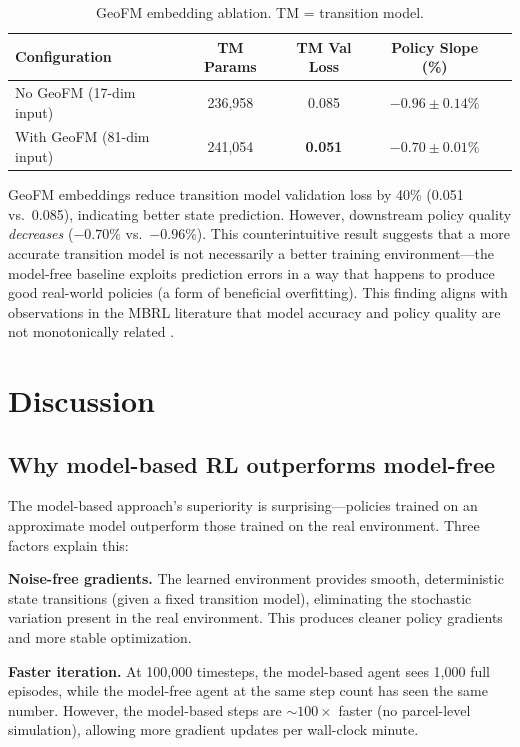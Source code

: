 \documentclass[11pt]{article}
\begin{document}
\begin{table}[htbp]
\centering
\caption{GeoFM embedding ablation. TM = transition model.}
\label{tab:e4}
\begin{tabular}{lcccc}
\toprule
Configuration & TM Params & TM Val Loss & Policy Slope (\%) \\
\midrule
No GeoFM (17-dim input)      & 236{,}958 & 0.085 & $-0.96 \pm 0.14\%$ \\
With GeoFM (81-dim input)    & 241{,}054 & \textbf{0.051} & $-0.70 \pm 0.01\%$ \\
\bottomrule
\end{tabular}
\end{table}

GeoFM embeddings reduce transition model validation loss by 40\% (0.051 vs.\ 0.085), indicating better state prediction. However, downstream policy quality \textit{decreases} ($-0.70\%$ vs.\ $-0.96\%$). This counterintuitive result suggests that a more accurate transition model is not necessarily a better training environment---the model-free baseline exploits prediction errors in a way that happens to produce good real-world policies (a form of beneficial overfitting). This finding aligns with observations in the MBRL literature that model accuracy and policy quality are not monotonically related \citep{lambert2022investigating}.


\section{Discussion}
\label{sec:discussion}

\subsection{Why model-based RL outperforms model-free}

The model-based approach's superiority is surprising---policies trained on an approximate model outperform those trained on the real environment. Three factors explain this:

\textbf{Noise-free gradients.} The learned environment provides smooth, deterministic state transitions (given a fixed transition model), eliminating the stochastic variation present in the real environment. This produces cleaner policy gradients and more stable optimization.

\textbf{Faster iteration.} At 100{,}000 timesteps, the model-based agent sees 1{,}000 full episodes, while the model-free agent at the same step count has seen the same number. However, the model-based steps are $\sim$$100\times$ faster (no parcel-level simulation), allowing more gradient updates per wall-clock minute.
\end{document}
